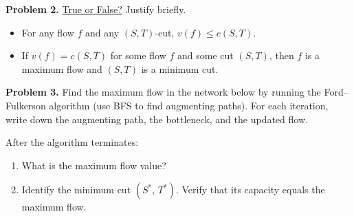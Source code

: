 \documentclass[11pt]{article}
\begin{document}
\vfill

\textbf{Problem 2.}
\underline{True or False?}  Justify briefly.

\begin{itemize}

  \item For any flow $f$ and any $(S,T)$-cut,
    $\displaystyle v(f) \le c(S,T)$.

  \vspace{1.5cm}

  \item If $v(f) = c(S,T)$ for some flow $f$ and some cut
        $(S,T)$, then $f$ is a maximum flow and $(S,T)$ is a
        minimum cut.

\end{itemize}

\vfill
\newpage

\textbf{Problem 3.}
Find the maximum flow in the network below by running the
Ford--Fulkerson algorithm (use BFS to find augmenting paths).
For each iteration, write down the augmenting path, the
bottleneck, and the updated flow.

\begin{center}
\end{center}

\vspace{8cm}

After the algorithm terminates:
\begin{enumerate}
  \item[(a)] What is the maximum flow value?
  \item[(b)] Identify the minimum cut $(S^*,\, T^*)$.  Verify
        that its capacity equals the maximum flow.
\end{enumerate}
\end{document}
